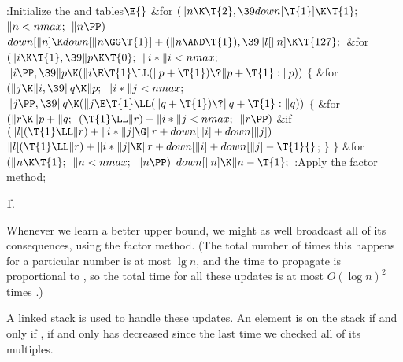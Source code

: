 \Y\B\4:Initialize the  and  tables\X${}\E{}$\6
\&{for} ${}(\|n\K\T{2},\39\\{down}[\T{1}]\K\T{1};{}$ ${}\|n<\\{nmax};{}$ ${}\|n%
\PP){}$\1\5
${}\\{down}[\|n]\K\\{down}[\|n\GG\T{1}]+(\|n\AND\T{1}),\39\|l[\|n]\K\T{127};{}$%
\2\6
\&{for} ${}(\|i\K\T{1},\39\|p\K\T{0};{}$ ${}\|i*\|i<\\{nmax};{}$ ${}\|i\PP,\39%
\|p\K(\|i\E\T{1}\LL(\|p+\T{1})\?\|p+\T{1}:\|p)){}$\5
${}\{{}$\1\6
\&{for} ${}(\|j\K\|i,\39\|q\K\|p;{}$ ${}\|i*\|j<\\{nmax};{}$ ${}\|j\PP,\39\|q%
\K(\|j\E\T{1}\LL(\|q+\T{1})\?\|q+\T{1}:\|q)){}$\5
${}\{{}$\1\6
\&{for} ${}(\|r\K\|p+\|q;{}$ ${}(\T{1}\LL\|r)+\|i*\|j<\\{nmax};{}$ ${}\|r%
\PP){}$\1\6
\&{if} ${}(\|l[(\T{1}\LL\|r)+\|i*\|j]\G\|r+\\{down}[\|i]+\\{down}[\|j]){}$\1\5
${}\|l[(\T{1}\LL\|r)+\|i*\|j]\K\|r+\\{down}[\|i]+\\{down}[\|j]-\T{1}{}$;\2\2\6
\4${}\}{}$\2\6
\4${}\}{}$\2\6
\&{for} ${}(\|n\K\T{1};{}$ ${}\|n<\\{nmax};{}$ ${}\|n\PP){}$\1\5
${}\\{down}[\|n]\K\|n-\T{1};{}$\2\6
:Apply the factor method\X;\par
\U1.\fi

Whenever we learn a better upper bound, we might as well
broadcast all
of its consequences, using the factor method. (The total number of
times this happens for a particular number  is at most $\lg n$,
and the time to propagate is proportional to , so the
total time for all these updates is at most $O(\log n)^2$ times .)

A linked stack is used to handle these updates. An element  is on the
stack if and only if , if and only  has
decreased
since the last time we checked all of its multiples.

